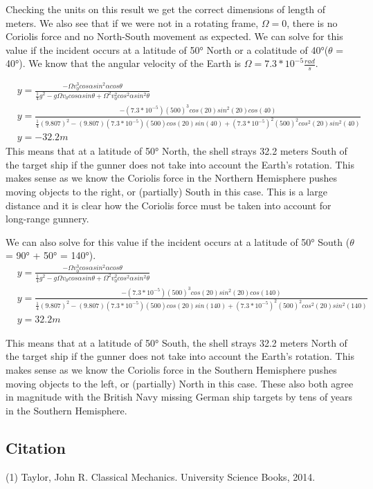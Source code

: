 \documentclass{article}
\begin{document}
Checking the units on this result we get the correct dimensions of length of meters. We also see that if we were not in a rotating frame, $\Omega=0$, there is no Coriolis force and no North-South movement as expected. We can solve for this value if the incident occurs at a latitude of 50° North or a colatitude of 40°($\theta$ = 40°). We know that the angular velocity of the Earth is $\Omega = 7.3 * 10^{-5} \frac{rad}{s}.$

\begin{align*}
    &y= \frac{-\Omega v_0^3 cos\alpha sin^2\alpha cos\theta}{\frac{1}{4}g^2 - g\Omega v_0cos\alpha sin\theta+ \Omega^2 v_0^2cos^2\alpha sin^2\theta}  \\
    &y = \frac{-(7.3 * 10^{-5}) (500)^3 cos(20) sin^2(20) cos(40)}{\frac{1}{4}(9.807)^2 - (9.807)(7.3 * 10^{-5}) (500)cos(20) sin(40)+ (7.3 * 10^{-5})^2 (500)^2 cos^2(20) sin^2(40)} \\
    &\boxed{y = -32.2 m}
\end{align*}
This means that at a latitude of 50° North, the shell strays 32.2 meters South of the target ship if the gunner does not take into account the Earth's rotation. This makes sense as we know the Coriolis force in the Northern Hemisphere pushes moving objects to the right, or (partially) South in this case. This is a large distance and it is clear how the Coriolis force must be taken into account for long-range gunnery. 

We can also solve for this value if the incident occurs at a latitude of 50° South ($\theta$ = 90° + 50° = 140°). 
\begin{align*}
    &y = \frac{-\Omega v_0^3 cos\alpha sin^2\alpha cos\theta}{\frac{1}{4}g^2 - g\Omega v_0cos\alpha sin\theta+ \Omega^2 v_0^2cos^2\alpha sin^2\theta}  \\
    &y = \frac{-(7.3 * 10^{-5}) (500)^3 cos(20) sin^2(20) cos(140)}{\frac{1}{4}(9.807)^2 - (9.807)(7.3 * 10^{-5}) (500)cos(20) sin(140)+ (7.3 * 10^{-5})^2 (500)^2 cos^2(20) sin^2(140)} \\
    &\boxed{y = 32.2 m}
\end{align*}

This means that at a latitude of 50° South, the shell strays 32.2 meters North of the target ship if the gunner does not take into account the Earth's rotation.  This makes sense as we know the Coriolis force in the Southern Hemisphere pushes moving objects to the left, or (partially) North in this case. These also both agree in magnitude with the British Navy missing German ship targets by tens of years in the Southern Hemisphere. 



\subsection*{Citation}
(1) Taylor, John R. Classical Mechanics. University Science Books, 2014. 
\end{document}
